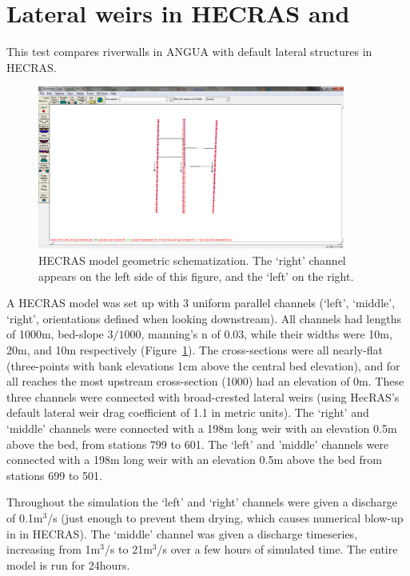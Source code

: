 \section{Lateral weirs in HECRAS and \anuga{}}

This test compares riverwalls in ANGUA with default lateral structures in
HECRAS. 

\begin{figure}
\begin{center}
\includegraphics[width=0.9\textwidth]{hecras_riverwall_anugaTest/RASGeometry_levee.png}
\end{center}
\caption{HECRAS model geometric schematization. The `right' channel appears on
the left side of this figure, and the `left' on the right.}
\label{schematic}
\end{figure}

A HECRAS model was set up with 3 uniform parallel channels (`left', `middle',
`right', orientations defined when looking downstream). All channels had
lengths of 1000m, bed-slope $3/1000$, manning's n of 0.03, while their widths were 10m,
20m, and 10m respectively (Figure~\ref{schematic}). The cross-sections were all
nearly-flat (three-points with bank elevations 1cm above the central bed
elevation), and for all reaches the most upstream cross-section (1000) had an
elevation of 0m. These three channels were connected with broad-crested lateral
weirs (using HecRAS's default lateral weir drag coefficient of 1.1 in metric
units). The `right' and `middle' channels were connected with a 198m long weir
with an elevation 0.5m above the bed, from stations 799 to 601. The `left' and
'middle' channels were connected with a 198m long weir with an elevation 0.5m
above the bed from stations 699 to 501. 

Throughout the simulation the `left' and `right' channels were given a
discharge of 0.1m$^3$/s (just enough to prevent them drying, which causes numerical
blow-up in in HECRAS). The `middle' channel was given a discharge timeseries,
increasing from 1m$^3$/s to 21m$^3$/s over a few hours of simulated time. The entire model
is run for 24hours.

